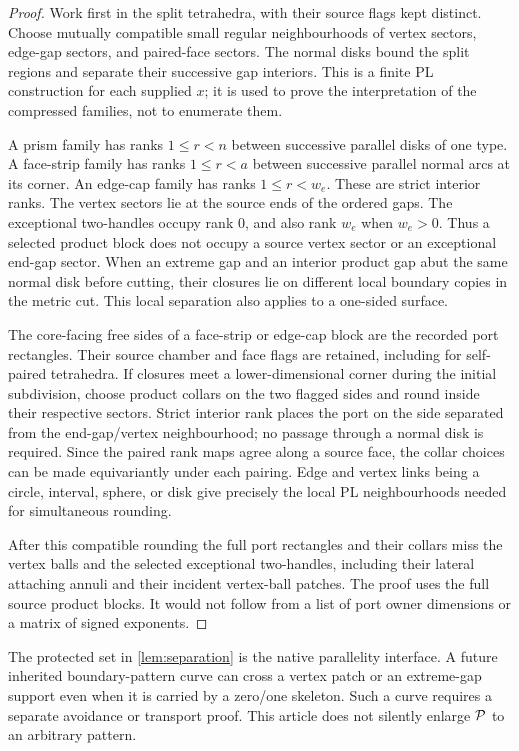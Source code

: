 \begin{proof}
Work first in the split tetrahedra, with their source flags kept distinct.
Choose mutually compatible small regular neighbourhoods of vertex sectors,
edge-gap sectors, and paired-face sectors. The normal disks bound the split
regions and separate their successive gap interiors. This is a finite PL
construction for each supplied $x$; it is used to prove the interpretation
of the compressed families, not to enumerate them.

A prism family has ranks $1\leq r<n$ between successive parallel disks of
one type. A face-strip family has ranks $1\leq r<a$ between successive
parallel normal arcs at its corner. An edge-cap family has ranks
$1\leq r<w_e$. These are strict interior ranks. The vertex sectors lie at
the source ends of the ordered gaps. The exceptional two-handles occupy
rank $0$, and also rank $w_e$ when $w_e>0$. Thus a selected product block
does not occupy a source vertex sector or an exceptional end-gap sector.
When an extreme gap and an interior product gap abut the same normal disk
before cutting, their closures lie on different local boundary copies in
the metric cut. This local separation also applies to a one-sided surface.

The core-facing free sides of a face-strip or edge-cap block are the
recorded port rectangles. Their source chamber and face flags are retained,
including for self-paired tetrahedra. If closures meet a lower-dimensional
corner during the initial subdivision, choose product collars on the two
flagged sides and round inside their respective sectors. Strict interior
rank places the port on the side separated from the end-gap/vertex
neighbourhood; no passage through a normal disk is required. Since the
paired rank maps agree along a source face, the collar choices can be made
equivariantly under each pairing. Edge and vertex links being a circle,
interval, sphere, or disk give precisely the local PL neighbourhoods needed
for simultaneous rounding.

After this compatible rounding the full port rectangles and their collars
miss the vertex balls and the selected exceptional two-handles, including
their lateral attaching annuli and their incident vertex-ball patches.
The proof uses the full source product blocks. It would not follow from a
list of port owner dimensions or a matrix of signed exponents.
\end{proof}

\begin{remark}
The protected set in \cref{lem:separation} is the native parallelity
interface. A future inherited boundary-pattern curve can cross a vertex
patch or an extreme-gap support even when it is carried by a zero/one
skeleton. Such a curve requires a separate avoidance or transport proof.
This article does not silently enlarge $\mathcal P$ to an arbitrary pattern.
\end{remark}

